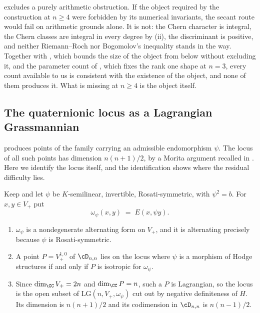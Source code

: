 \begin{remark}%
\label{rem:notforbidden}
 excludes a purely arithmetic obstruction. If the
object required by the construction at $n\ge4$ were forbidden by its
numerical invariants, the secant route would fail on arithmetic grounds
alone. It is not: the Chern character is integral, the Chern classes are
integral in every degree by (ii), the
discriminant is positive, and neither Riemann--Roch nor Bogomolov's
inequality stands in the way.
Together with , which bounds the size of the object from
below without excluding it, and the parameter count of ,
which fixes the rank one shape at $n=3$, every count available to us is
consistent with the existence of the object, and none of them produces it.
What is missing at $n\ge4$ is the object itself.
\end{remark}

\subsection{The quaternionic locus as a Lagrangian Grassmannian}
\label{ssec:lagrangian}

 produces points of the family carrying an admissible
endomorphism $\psi$. The locus of all such points has dimension $n(n+1)/2$,
by a Morita argument recalled in . Here we identify the locus
itself, and the identification shows where the residual difficulty lies.

\begin{proposition}\label{prop:lagrangian}
Keep  and let $\psi$ be $K$-semilinear, invertible,
Rosati-symmetric, with $\psi^{2}=b$. For $x,y\in V_{+}$ put
\[
  \omega_{\psi}(x,y)\;=\;E(x,\psi y).
\]
\begin{enumerate}[label=\textup{(\roman*)},nosep]
\item $\omega_{\psi}$ is a nondegenerate alternating form on $V_{+}$, and it
  is alternating precisely because $\psi$ is Rosati-symmetric.
\item A point $P=V_{+}^{1,0}$ of $\cD_{n,n}$ lies on the locus where $\psi$
  is a morphism of Hodge structures if and only if $P$ is isotropic for
  $\omega_{\psi}$.
\item Since $\dim_{\CC}V_{+}=2n$ and $\dim_{\CC}P=n$, such a $P$ is
  Lagrangian, so the locus is the open subset of
  $\mathrm{LG}(n,V_{+},\omega_{\psi})$ cut out by negative definiteness of
  $H$. Its dimension is $n(n+1)/2$ and its codimension in $\cD_{n,n}$ is
  $n(n-1)/2$.
\end{enumerate}
\end{proposition}

